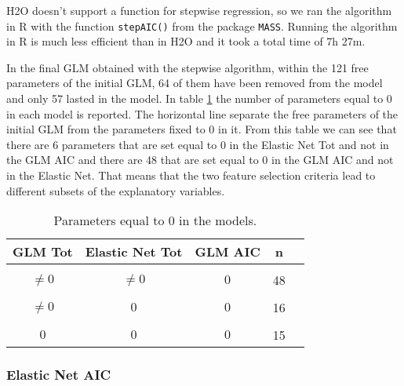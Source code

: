 \documentclass[a4paper, twoside, openright, 12pt]{report}
\theoremstyle{definition}
\theoremstyle{definition}
\theoremstyle{definition}
\theoremstyle{remark}
\begin{document}
H2O doesn't support a function for stepwise regression, so we ran the algorithm in R with the function \texttt{stepAIC()} from the package \texttt{MASS}. Running the algorithm in R is much less efficient than in H2O and it took a total time of 7h 27m.

In the final GLM obtained with the stepwise algorithm, within the 121 free parameters of the initial GLM, 64 of them have been removed from the model and only 57 lasted in the model. In table \ref{tab:coeff-0} the number of parameters equal to 0 in each model is reported. The horizontal line separate the free parameters of the initial GLM from the parameters fixed to 0 in it. From this table we can see that there are 6 parameters that are set equal to 0 in the Elastic Net Tot and not in the GLM AIC and there are 48 that are set equal to 0 in the GLM AIC and not in the Elastic Net. That means that the two feature selection criteria lead to different subsets of the explanatory variables.

\begin{table}[!h]

\caption{\label{tab:coeff-0}Parameters equal to 0 in the models.}
\centering
\begin{tabular}[t]{ccccc}
\toprule
\textbf{GLM Tot} & \textbf{Elastic Net Tot} & \textbf{GLM AIC} & \textbf{n} & \textbf{ }\\
\midrule[\heavyrulewidth]
\cellcolor{gray!6}{$\ne0$} & \cellcolor{gray!6}{$\ne0$} & \cellcolor{gray!6}{$\ne0$} & \cellcolor{gray!6}{51} & \\
$\ne0$ & $\ne0$ & $0$ & 48 & \\
\cellcolor{gray!6}{$\ne0$} & \cellcolor{gray!6}{$0$} & \cellcolor{gray!6}{$\ne0$} & \cellcolor{gray!6}{6} & \\
$\ne0$ & $0$ & $0$ & 16 & \multirow{-4}{*}{\centering\arraybackslash 121}\\
\midrule
\cellcolor{gray!6}{$0$} & \cellcolor{gray!6}{$\ne0$} & \cellcolor{gray!6}{$0$} & \cellcolor{gray!6}{23} & \\
$0$ & $0$ & $0$ & 15 & \multirow{-2}{*}{\centering\arraybackslash 38}\\
\bottomrule
\end{tabular}
\end{table}

\hypertarget{elastic-net-aic}{%
\subsubsection{Elastic Net AIC}\label{elastic-net-aic}}
\end{document}
